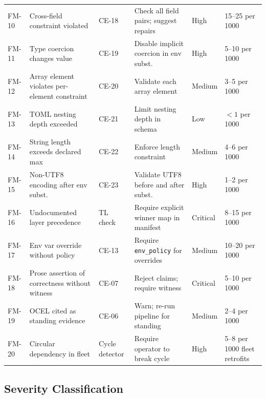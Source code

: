 \begin{longtable}{@{}p{1.5cm}p{2.0cm}p{2.2cm}p{2.0cm}p{2.0cm}p{2.2cm}@{}}
FM-10 & Cross-field constraint violated & CE-18 & Check all field pairs; suggest repairs & High & 15--25 per 1000 \\

FM-11 & Type coercion changes value & CE-19 & Disable implicit coercion in env subst. & High & 5--10 per 1000 \\

FM-12 & Array element violates per-element constraint & CE-20 & Validate each array element & Medium & 3--5 per 1000 \\

FM-13 & TOML nesting depth exceeded & CE-21 & Limit nesting depth in schema & Low & $< 1$ per 1000 \\

FM-14 & String length exceeds declared max & CE-22 & Enforce length constraint & Medium & 4--6 per 1000 \\

FM-15 & Non-UTF8 encoding after env subst. & CE-23 & Validate UTF8 before and after subst. & High & 1--2 per 1000 \\

FM-16 & Undocumented layer precedence & TL check & Require explicit winner map in manifest & Critical & 8--15 per 1000 \\

FM-17 & Env var override without policy & CE-13 & Require \texttt{env\_policy} for overrides & Medium & 10--20 per 1000 \\

FM-18 & Prose assertion of correctness without witness & CE-07 & Reject claims; require witness & Critical & 5--10 per 1000 \\

FM-19 & OCEL cited as standing evidence & CE-06 & Warn; re-run pipeline for standing & Medium & 2--4 per 1000 \\

FM-20 & Circular dependency in fleet & Cycle detector & Require operator to break cycle & High & 5--8 per 1000 fleet retrofits \\

\bottomrule
\end{longtable}

\subsection{Severity Classification}

